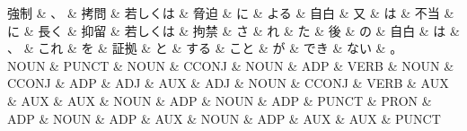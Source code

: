 \documentclass[tikz,border=5pt]{standalone}
\begin{document}
\small
\begin{dependency}[edge unit distance=12.0pt]
    \begin{deptext}[column sep=0.5em]
        強制 \& 、 \& 拷問 \& 若しくは \& 脅迫 \& に \& よる \& 自白 \& 又 \& は \& 不当 \& に \& 長く \& 抑留 \& 若しくは \& 拘禁 \& さ \& れ \& た \& 後 \& の \& 自白 \& は \& 、 \& これ \& を \& 証拠 \& と \& する \& こと \& が \& でき \& ない \& 。\\
        NOUN \& PUNCT \& NOUN \& CCONJ \& NOUN \& ADP \& VERB \& NOUN \& CCONJ \& ADP \& ADJ \& AUX \& ADJ \& NOUN \& CCONJ \& VERB \& AUX \& AUX \& AUX \& NOUN \& ADP \& NOUN \& ADP \& PUNCT \& PRON \& ADP \& NOUN \& ADP \& AUX \& NOUN \& ADP \& AUX \& AUX \& PUNCT\\
    \end{deptext}
\end{dependency}
\end{document}

